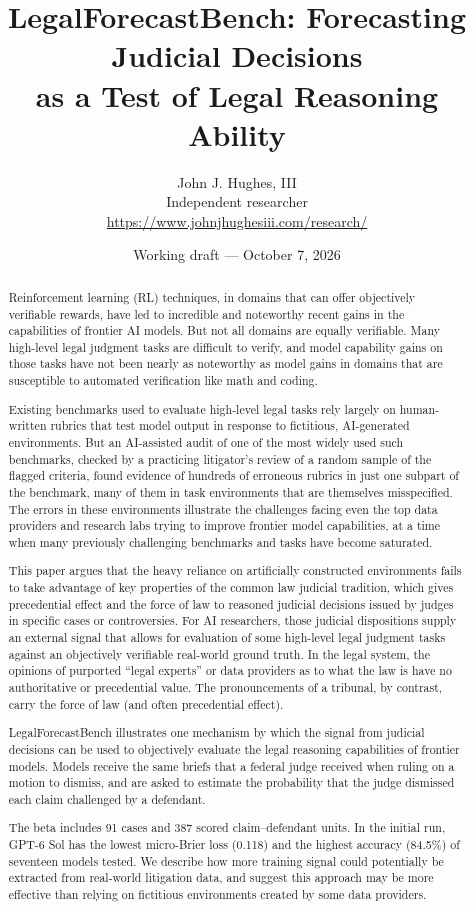 \documentclass[11pt]{article}
\title{LegalForecastBench: Forecasting Judicial Decisions\\as a Test of Legal Reasoning Ability}
\author{John J. Hughes, III\\Independent researcher\\\url{https://www.johnjhughesiii.com/research/}}
\date{Working draft --- October 7, 2026}
\begin{document}
\maketitle
\begin{abstract}
Reinforcement learning (RL) techniques, in domains that can offer objectively verifiable rewards, have led to incredible and noteworthy recent gains in the capabilities of frontier AI models. But not all domains are equally verifiable. Many high-level legal judgment tasks are difficult to verify, and model capability gains on those tasks have not been nearly as noteworthy as model gains in domains that are susceptible to automated verification like math and coding.

Existing benchmarks used to evaluate high-level legal tasks rely largely on human-written rubrics that test model output in response to fictitious, AI-generated environments. But an AI-assisted audit of one of the most widely used such benchmarks, checked by a practicing litigator's review of a random sample of the flagged criteria, found evidence of hundreds of erroneous rubrics in just one subpart of the benchmark, many of them in task environments that are themselves misspecified. The errors in these environments illustrate the challenges facing even the top data providers and research labs trying to improve frontier model capabilities, at a time when many previously challenging benchmarks and tasks have become saturated.

This paper argues that the heavy reliance on artificially constructed environments fails to take advantage of key properties of the common law judicial tradition, which gives precedential effect and the force of law to reasoned judicial decisions issued by judges in specific cases or controversies. For AI researchers, those judicial dispositions supply an external signal that allows for evaluation of some high-level legal judgment tasks against an objectively verifiable real-world ground truth. In the legal system, the opinions of purported ``legal experts'' or data providers as to what the law is have no authoritative or precedential value. The pronouncements of a tribunal, by contrast, carry the force of law (and often precedential effect).

LegalForecastBench illustrates one mechanism by which the signal from judicial decisions can be used to objectively evaluate the legal reasoning capabilities of frontier models. Models receive the same briefs that a federal judge received when ruling on a motion to dismiss, and are asked to estimate the probability that the judge dismissed each claim challenged by a defendant.

The beta includes 91 cases and 387 scored claim--defendant units. In the initial run, GPT-6 Sol has the lowest micro-Brier loss (0.118) and the highest accuracy (84.5\%) of seventeen models tested. We describe how more training signal could potentially be extracted from real-world litigation data, and suggest this approach may be more effective than relying on fictitious environments created by some data providers.
\end{abstract}
\end{document}
